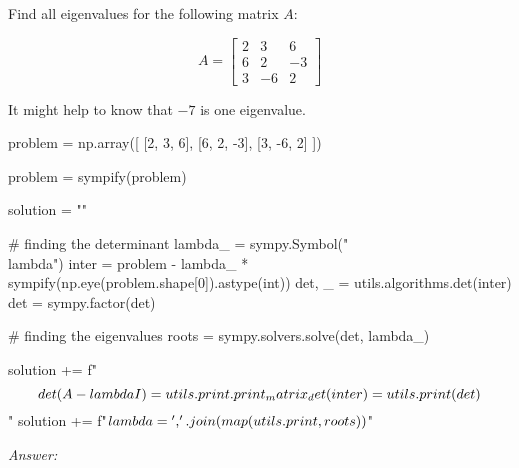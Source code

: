\documentclass[letterpaper]{article}
\newcommand{\ans}{\textit{Answer: }}
\newenvironment{question}[2][Question]{\begin{trivlist}
\item[\hskip \labelsep {\bfseries #1}\hskip \labelsep {\bfseries #2.}]}{\end{trivlist}}
\begin{document}
\begin{question}{5.46}
  Find all eigenvalues for the following matrix $A :$

  $$
  A=\left[ \begin{array}{rrr}{2} & {3} & {6} \\ {6} & {2} & {-3} \\ {3} & {-6} & {2}\end{array}\right]
  $$

  It might help to know that $-7$ is one eigenvalue.

  \begin{pycode}
problem = np.array([
  [2, 3, 6],
  [6, 2, -3],
  [3, -6, 2]
])

problem = sympify(problem)

solution = ""

# finding the determinant 
lambda_ = sympy.Symbol("\\lambda")
inter = problem - lambda_ * sympify(np.eye(problem.shape[0]).astype(int))
det, _ = utils.algorithms.det(inter)
det = sympy.factor(det)

# finding the eigenvalues
roots = sympy.solvers.solve(det, lambda_)

solution += f"$$\\det(A - \\lambda I) = {utils.print.print_matrix_det(inter)} = {utils.print(det)}$$\n"
solution += f"$\\lambda = {', '.join(map(utils.print, roots))}$\n"
  \end{pycode}

  \ans 

\end{question}
\end{document}
